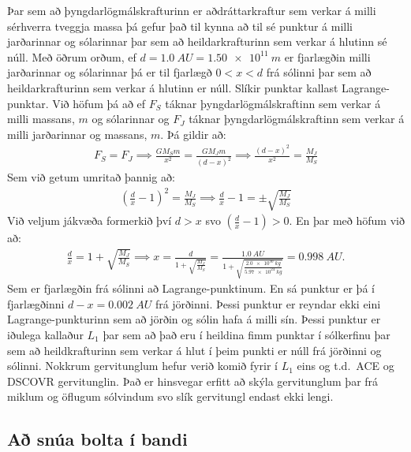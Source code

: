 Þar sem að þyngdarlögmálskrafturinn er aðdráttarkraftur sem verkar á milli sérhverra tveggja massa þá gefur það til kynna að til sé punktur á milli jarðarinnar og sólarinnar þar sem að heildarkrafturinn sem verkar á hlutinn sé núll. Með öðrum orðum, ef $d = \SI{1.0}{AU} = \SI{1.50e11}{m}$ er fjarlægðin milli jarðarinnar og sólarinnar þá er til fjarlægð $0 < x < d$ frá sólinni þar sem að heildarkrafturinn sem verkar á hlutinn er núll. Slíkir punktar kallast Lagrange-punktar. Við höfum þá að ef $F_S$ táknar þyngdarlögmálskraftinn sem verkar á milli massans, $m$ og sólarinnar og $F_J$ táknar þyngdarlögmálskraftinn sem verkar á milli jarðarinnar og massans, $m$. Þá gildir að:
\begin{align*}
    F_S = F_J \implies \frac{GM_Sm}{x^2} = \frac{GM_Jm}{(d-x)^2} \implies \frac{(d-x)^2}{x^2} = \frac{M_J}{M_S}
\end{align*}
Sem við getum umritað þannig að:
\begin{align*}
    \left( \frac{d}{x}-1 \right)^2 = \frac{M_J}{M_S} \implies \frac{d}{x}-1 =  \pm \sqrt{\frac{M_J}{M_S}}
\end{align*}
Við veljum jákvæða formerkið því $d > x$ svo $\left(\frac{d}{x}-1\right) > 0$. En þar með höfum við að:
\begin{align*}
    \frac{d}{x} = 1 + \sqrt{\frac{M_J}{M_S}} \implies x = \frac{d}{1+\sqrt{\frac{M_J}{M_S}}} = \frac{\SI{1.0}{AU}}{1+ \sqrt{\frac{\SI{2.0e30}{kg}}{\SI{5.97e24}{kg}}}} = \SI{0.998}{AU}.
\end{align*}
Sem er fjarlægðin frá sólinni að Lagrange-punktinum. En sá punktur er þá í fjarlægðinni $d-x = \SI{0.002}{AU}$ frá jörðinni. Þessi punktur er reyndar ekki eini Lagrange-punkturinn sem að jörðin og sólin hafa á milli sín. Þessi punktur er iðulega kallaður $L_1$ þar sem að það eru í heildina fimm punktar í sólkerfinu þar sem að heildkrafturinn sem verkar á hlut í þeim punkti er núll frá jörðinni og sólinni. Nokkrum gervitunglum hefur verið komið fyrir í $L_1$ eins og t.d.~ACE og DSCOVR gervitunglin. Það er hinsvegar erfitt að skýla gervitunglum þar frá miklum og öflugum sólvindum svo slík gervitungl endast ekki lengi.

\subsection*{Að snúa bolta í bandi}

